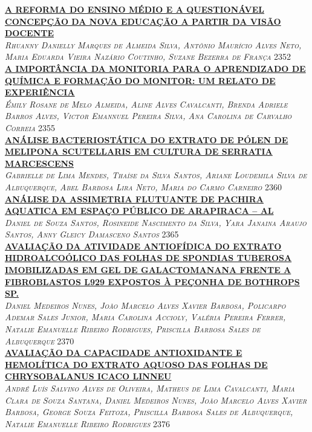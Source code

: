 \noindent \textsc{\hyperlink{trabalhos/250304.pdf.1}{\textbf{A REFORMA DO ENSINO MÉDIO E A QUESTIONÁVEL CONCEPÇÃO DA NOVA EDUCAÇÃO A PARTIR DA VISÃO DOCENTE}}}\\ 
\noindent \textsc{\textit{Rhuanny Danielly Marques de Almeida Silva, Antônio Maurício Alves Neto, Maria Eduarda Vieira Nazário Coutinho, Suzane Bezerra de França}} \hfill 2352\\ 

\noindent \textsc{\hyperlink{trabalhos/247848.pdf.1}{\textbf{A IMPORTÂNCIA DA MONITORIA PARA O APRENDIZADO DE QUÍMICA E FORMAÇÃO DO MONITOR: UM RELATO DE EXPERIÊNCIA}}}\\ 
\noindent \textsc{\textit{Émily Rosane de Melo Almeida, Aline Alves Cavalcanti, Brenda Adriele Barros Alves, Victor Emannuel Pereira Silva, Ana Carolina de Carvalho Correia}} \hfill 2355\\ 

\noindent \textsc{\hyperlink{trabalhos/250299.pdf.1}{\textbf{ANÁLISE BACTERIOSTÁTICA DO EXTRATO DE PÓLEN DE MELIPONA SCUTELLARIS EM CULTURA DE SERRATIA MARCESCENS}}}\\ 
\noindent \textsc{\textit{Gabrielle de Lima Mendes, Thaíse da Silva Santos, Ariane Loudemila Silva de Albuquerque, Abel Barbosa Lira Neto, Maria do Carmo Carneiro}} \hfill 2360\\ 

\noindent \textsc{\hyperlink{trabalhos/247083.pdf.1}{\textbf{ANÁLISE DA ASSIMETRIA FLUTUANTE DE PACHIRA AQUATICA EM ESPAÇO PÚBLICO DE ARAPIRACA – AL}}}\\ 
\noindent \textsc{\textit{Daniel de Souza Santos, Rosineide Nascimento da Silva, Yara Janaina Araujo Santos, Anny Gleicy Damasceno Santos}} \hfill 2365\\ 

\noindent \textsc{\hyperlink{trabalhos/251722.pdf.1}{\textbf{AVALIAÇÃO DA ATIVIDADE ANTIOFÍDICA DO EXTRATO HIDROALCOÓLICO DAS FOLHAS DE SPONDIAS TUBEROSA IMOBILIZADAS EM GEL DE GALACTOMANANA FRENTE A FIBROBLASTOS L929 EXPOSTOS À PEÇONHA DE BOTHROPS SP.}}}\\ 
\noindent \textsc{\textit{Daniel Medeiros Nunes, João Marcelo Alves Xavier Barbosa, Policarpo Ademar Sales Junior, Maria Carolina Accioly, Valéria Pereira Ferrer, Natalie Emanuelle Ribeiro Rodrigues, Priscilla Barbosa Sales de Albuquerque}} \hfill 2370\\ 

\noindent \textsc{\hyperlink{trabalhos/251643.pdf.1}{\textbf{AVALIAÇÃO DA CAPACIDADE ANTIOXIDANTE E HEMOLÍTICA DO EXTRATO AQUOSO DAS FOLHAS DE CHRYSOBALANUS ICACO LINNEU}}}\\ 
\noindent \textsc{\textit{André Luís Salvino Alves de Oliveira, Matheus de Lima Cavalcanti, Maria Clara de Souza Santana, Daniel Medeiros Nunes, João Marcelo Alves Xavier Barbosa, George Souza Feitoza, Priscilla Barbosa Sales de Albuquerque, Natalie Emanuelle Ribeiro Rodrigues}} \hfill 2376\\ 

